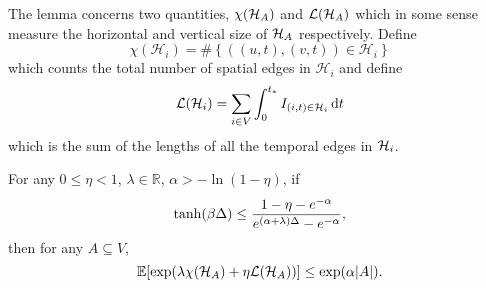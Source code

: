 	The lemma concerns two quantities, $\chi(\mathcal{H}_A)$ and $\mathcal{L}(\mathcal{H}_A)$ which in some sense measure the horizontal and vertical size of $\mathcal{H}_A$ respectively. 
	Define
	\begin{equation}
		\chi(\mathcal{H}_i) = \#\left\{ \left( (u,t), (v,t) \right) \in \mathcal{H}_i \right\}
	\end{equation}
	which counts the total number of spatial edges in $\mathcal{H}_i$ and define
	\begin{equation}
		\mathcal{L}(\mathcal{H}_i) = \sum_{i \in V} \int_{0}^{t_*} I_{(i, t) \in \mathcal{H}_i} \, \mathrm{d} t
	\end{equation}
	which is the sum of the lengths of all the temporal edges in $\mathcal{H}_i$. 

	\begin{lemma}
		\label{lem:full submartingale thing}
		For any $0 \leq \eta < 1$, $\lambda \in \mathbb{R}$, $\alpha > -\ln(1 - \eta)$, if
		\begin{equation}
			\tanh(\beta\Delta) \leq \frac{1 - \eta - e^{-\alpha}}{e^{(\alpha+\lambda)\Delta} - e^{-\alpha}},
		\end{equation}
		then for any $A \subseteq V$,
		\begin{equation}
			\mathbb{E}[\exp(\lambda \chi(\mathcal{H}_A) + \eta \mathcal{L}(\mathcal{H}_A))] \leq \exp(\alpha |A|).
		\end{equation}
	\end{lemma}
